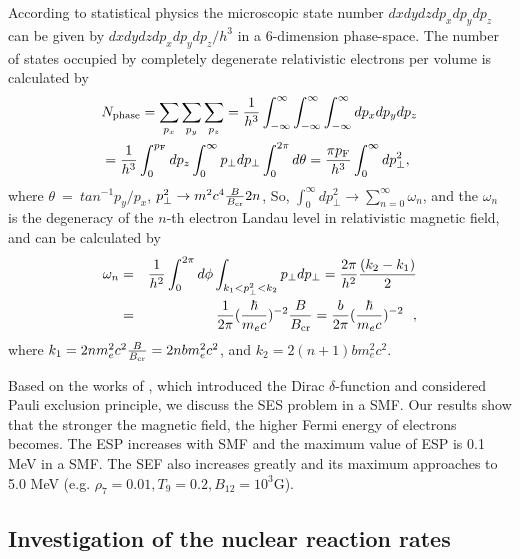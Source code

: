 \documentclass[manuscript]{aastex}
\begin{document}
According to statistical physics the microscopic state number
$dxdydzdp_{x}dp_{y}dp_{z}$ can be given by
$dxdydzdp_{x}dp_{y}dp_{z}/h^{3}$ in a 6-dimension phase-space. The
number of states occupied by completely degenerate relativistic
electrons per volume is calculated by \citep{Canuto68, Canuto71}
\begin{eqnarray}
 &N_{\rm{phase}}= \sum_{p_{x}}\sum_{p_{y}}\sum_{p_{z}}
 = \frac{1}{h^{3}}\int_{-\infty}^{\infty}\int_{-\infty}^{\infty}\int_{-\infty}^{\infty}dp_{x}dp_{y}dp_{z}\nonumber\\
 &= \frac{1}{h^{3}}\int_{0}^{p_{\rm F}}dp_{z}\int_{0}^{\infty}p_{\bot}dp_{\bot}\int_{0}^{2\pi}d\theta
 = \frac{\pi p_{\rm F}}{h^{3}}\int_{0}^{\infty}dp_{\bot}^{2},
\label{54}
 \end{eqnarray}
where $\theta~=~tan^{-1}p_{y}/p_{x}$, $p_{\bot}^{2}\rightarrow
m^{2}c^{4}\frac{B}{B_{\rm cr}}2n$, So,
$\int_{0}^{\infty}dp_{\bot}^{2}\rightarrow
\sum_{n=0}^{\infty}\omega_{n}$, and the $\omega_{n}$ is the
degeneracy of the $n$-th electron Landau level in relativistic
magnetic field, and can be calculated by \citep{Canuto71, Kubo65,
Pathria03}
\begin{eqnarray}
\omega_{n}&=& \frac{1}{h^{2}}\int_{0}^{2\pi}d\phi\int_{k_{1} < p_{\bot}^{2}< k_{2}}p_{\bot}dp_{\bot}= \frac{2\pi}{h^{2}}\frac{(k_{2}-k_{1})}{2}\nonumber\\
&=&\frac{1}{2\pi}(\frac{\hbar}{m_{e}c})^{-2}\frac{B}{B_{\rm
cr}}=\frac{b}{2\pi}(\frac{\hbar}{m_{e}c})^{-2} ~~, \label{55}
\end{eqnarray}
where $k_{1}= 2nm_e^{2}c^{2}\frac{B}{B_{\rm cr}}= 2nbm_e^{2}c^{2}$,
and $k_{2}= 2(n+1)bm_e^{2}c^{2}$.

Based on the works of \citet{Peng07, Gao13}, which introduced the
Dirac $\delta$-function and considered Pauli exclusion principle, we
discuss the SES problem in a SMF. Our results show that the stronger
the magnetic field, the higher Fermi energy of electrons becomes.
The ESP increases with SMF and the maximum value of ESP is 0.1 MeV
in a SMF. The SEF also increases greatly and its maximum approaches
to 5.0 MeV (e.g. $\rho_7=0.01, T_9=0.2, B_{12}=10^3$G).

\subsection{Investigation of the nuclear reaction rates}
\end{document}

